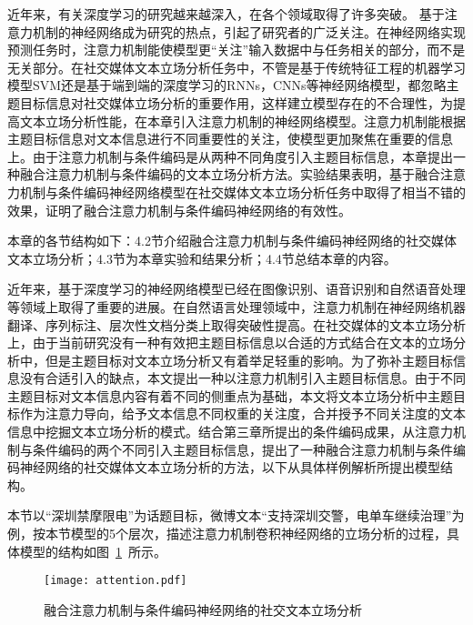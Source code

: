 

近年来，有关深度学习的研究越来越深入，在各个领域取得了许多突破。 基于注意力机制的神经网络成为研究的热点，引起了研究者的广泛关注。在神经网络实现预测任务时，注意力机制能使模型更“关注”输入数据中与任务相关的部分，而不是无关部分。在社交媒体文本立场分析任务中，不管是基于传统特征工程的机器学习模型SVM还是基于端到端的深度学习的RNNs，CNNs等神经网络模型，都忽略主题目标信息对社交媒体立场分析的重要作用，这样建立模型存在的不合理性，为提高文本立场分析性能，在本章引入注意力机制的神经网络模型。注意力机制能根据主题目标信息对文本信息进行不同重要性的关注，使模型更加聚焦在重要的信息上。由于注意力机制与条件编码是从两种不同角度引入主题目标信息，本章提出一种融合注意力机制与条件编码的文本立场分析方法。实验结果表明，基于融合注意力机制与条件编码神经网络模型在社交媒体文本立场分析任务中取得了相当不错的效果，证明了融合注意力机制与条件编码神经网络的有效性。

本章的各节结构如下：4.2节介绍融合注意力机制与条件编码神经网络的社交媒体文本立场分析；4.3节为本章实验和结果分析；4.4节总结本章的内容。


近年来，基于深度学习的神经网络模型已经在图像识别、语音识别和自然语音处理等领域上取得了重要的进展。在自然语言处理领域中，注意力机制在神经网络机器翻译、序列标注、层次性文档分类上取得突破性提高。在社交媒体的文本立场分析上，由于当前研究没有一种有效把主题目标信息以合适的方式结合在文本的立场分析中，但是主题目标对文本立场分析又有着举足轻重的影响。为了弥补主题目标信息没有合适引入的缺点，本文提出一种以注意力机制引入主题目标信息。由于不同主题目标对文本信息内容有着不同的侧重点为基础，本文将文本立场分析中主题目标作为注意力导向，给予文本信息不同权重的关注度，合并授予不同关注度的文本信息中挖掘文本立场分析的模式。结合第三章所提出的条件编码成果，从注意力机制与条件编码的两个不同引入主题目标信息，提出了一种融合注意力机制与条件编码神经网络的社交媒体文本立场分析的方法，以下从具体样例解析所提出模型结构。


本节以“深圳禁摩限电”为话题目标，微博文本“支持深圳交警，电单车继续治理”为例，按本节模型的5个层次，描述注意力机制卷积神经网络的立场分析的过程，具体模型的结构如图~\ref{GRU_CNN}~所示。

\begin{figure}[htbp]
	\centering
	\texttt{[image: attention.pdf]}
	\caption[]{融合注意力机制与条件编码神经网络的社交文本立场分析}
	\label{GRU_CNN}
\end{figure}

